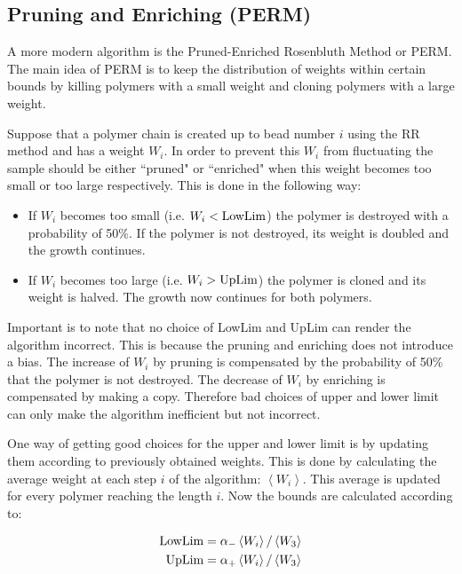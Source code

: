 \subsection*{Pruning and Enriching (PERM)}
A more modern algorithm is the Pruned-Enriched Rosenbluth Method or PERM. The main idea of PERM is to keep the distribution of weights within certain bounds by killing polymers with a small weight and cloning polymers with a large weight.

Suppose that a polymer chain is created up to bead number $i$ using the RR method and has a weight $W_i$. In order to prevent this $W_i$ from fluctuating the sample should be either ``pruned" or ``enriched" when this weight becomes too small or too large respectively. This is done in the following way:

\begin{itemize}
  \item If $W_i$ becomes too small (i.e. $W_i < \textup{LowLim}$) the polymer is destroyed with a probability of 50\%. If the polymer is not destroyed, its weight is doubled and the growth continues.
  \item If $W_i$ becomes too large (i.e. $W_i > \textup{UpLim}$) the polymer is cloned and its weight is halved. The growth now continues for both polymers.
\end{itemize}

Important is to note that no choice of LowLim and UpLim can render the algorithm incorrect. This is because the pruning and enriching does not introduce a bias. The increase of $W_i$ by pruning is compensated by the probability of 50\% that the polymer is not destroyed. The decrease of $W_i$ by enriching is compensated by making a copy. Therefore bad choices of upper and lower limit can only make the algorithm inefficient but not incorrect.

One way of getting good choices for the upper and lower limit is by updating them according to previously obtained weights. This is done by calculating the average weight at each step $i$ of the algorithm: $\left \langle W_i \right \rangle$. This average is updated for every polymer reaching the length $i$. Now the bounds are calculated according to:

\begin{align} \label{eq:LowLim_UpLim}
	\textup{LowLim} &= \alpha_- \left \langle W_i \right \rangle / \left \langle W_3 \right \rangle \\
	\textup{UpLim} &= \alpha_+ \left \langle W_i \right \rangle / \left \langle W_3 \right \rangle
\end{align}

